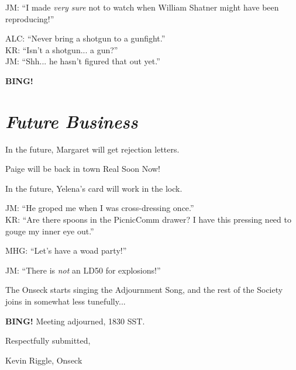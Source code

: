 \documentclass[10pt]{article}
\newcommand{\bing}{{\bf BING!} }
\newcommand{\goto}[1]{\bing \vskip 12pt \section*{{\em{#1}}}}
\begin{document}
JM: ``I made \emph{very sure} not to watch when William Shatner might have been reproducing!''

ALC: ``Never bring a shotgun to a gunfight.''\\
KR: ``Isn't a shotgun... a gun?''\\
JM: ``Shh... he hasn't figured that out yet.''

\goto{Future Business}
In the future, Margaret will get rejection letters.

Paige will be back in town Real Soon Now!

In the future, Yelena's card will work in the lock.

JM: ``He groped me when I was cross-dressing once.''\\
KR: ``Are there spoons in the PicnicComm drawer?  I have this pressing need to gouge my inner eye
out.''

MHG: ``Let's have a woad party!''

JM: ``There is \emph{not} an LD50 for explosions!''

The Onseck starts singing the Adjournment Song, and the rest of the Society joins in somewhat less
tunefully...

\bing
\noindent
Meeting adjourned, 1830 SST.

\vspace{18pt}

\centerline{Respectfully submitted,}
\centerline{Kevin Riggle, Onseck}
\end{document}
